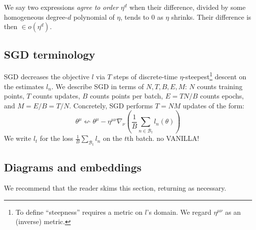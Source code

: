 \documentclass{article}
\theoremstyle{plain}
\theoremstyle{definition}
\newcommand{\wrap}[1]{\left(#1\right)}
\newcommand{\Bb}{\mathcal{B}}
\begin{document}
        We say two expressions \emph{agree to order $\eta^d$} when their
        difference, divided by some homogeneous degree-$d$ polynomial of
        $\eta$, tends to $0$ as $\eta$ shrinks.  Their difference is then $\in
        o(\eta^d)$.
        

    \subsection{SGD terminology}
        SGD decreases the objective $l$ via $T$ steps of discrete-time
        $\eta$-steepest\footnote{
            To define ``steepness'' requires a metric on $l$'s domain.  We
            regard $\eta^{\mu\nu}$ as an (inverse) metric.
        } descent on the estimates $l_n$.
        We describe SGD in terms of $N,T,B,E,M$:
            $N$ counts training points,
            $T$ counts updates,
            $B$ counts points per batch,
            $E=TN/B$ counts epochs, 
            and $M=E/B=T/N$.
        Concretely, SGD performs $T=NM$ updates of the form:
        $$
            \theta^\mu
            \leftsquigarrow
            \theta^\mu -
            \eta^{\mu\nu} \nabla_\nu
                \wrap{\frac{1}{B} \sum_{n\in \Bb_t} l_n(\theta)}
        $$
        We write $l_t$ for the loss $\frac{1}{B}\sum_{\Bb_t} l_n$ on the $t$th
        batch. 
        {\color{red} no VANILLA!}  


    \subsection{Diagrams and embeddings}

        We recommend that the reader skims this section, returning as
        necessary.
\end{document}
